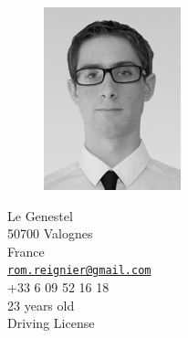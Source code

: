 \documentclass[a4paper,11pt,final]{memoir}
\begin{document}
\begin{figure}
	\hfill
	\includegraphics[width=0.5\columnwidth]{../IMG_7936-Modifier_cv}
	\vspace{-0.5cm}
\end{figure}

\begin{flushright}\small
	Le Genestel\\
	50700 Valognes\\
	France\\
	{\href{mailto:rom.reignier@gmail.com}{\nolinkurl{rom.reignier@gmail.com}}}\\
	+33 6 09 52 16 18\\
	23 years old\\
	Driving License
\end{flushright}%
\end{document}

